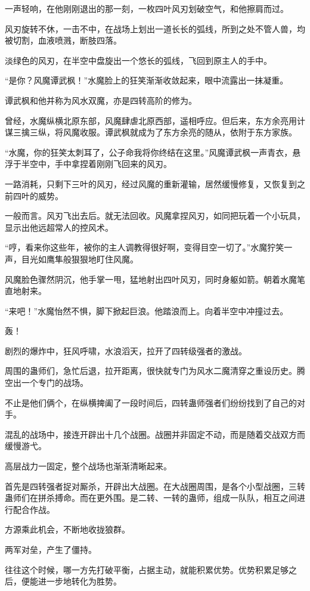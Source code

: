 \begin{this_body}
一声轻响，在他刚刚退出的那一刻，一枚四叶风刃划破空气，和他擦肩而过。

风刃旋转不休，一击不中，在战场上划出一道长长的弧线，所到之处不管人兽，均被切割，血液喷溅，断肢四落。

淡绿色的风刃，在半空中盘旋出一个悠长的弧线，飞回到原主人的手中。

“是你？风魔谭武枫！”水魔脸上的狂笑渐渐收敛起来，眼中流露出一抹凝重。

谭武枫和他并称为风水双魔，亦是四转高阶的修为。

曾经，水魔纵横北原东部，风魔肆虐北原西部，遥相呼应。但后来，东方余亮用计谋三擒三纵，将风魔收服。谭武枫就成为了东方余亮的随从，依附于东方家族。

“水魔，你的狂笑太刺耳了，公子命我将你终结在这里。”风魔谭武枫一声青衣，悬浮于半空中，手中拿捏着刚刚飞回来的风刃。

一路消耗，只剩下三叶的风刃，经过风魔的重新灌输，居然缓慢修复，又恢复到之前四叶的威势。

一般而言。风刃飞出去后。就无法回收。风魔拿捏风刃，如同把玩着一个小玩具，显示出他远超常人的控风术。

“哼，看来你这些年，被你的主人调教得很好啊，变得目空一切了。”水魔狞笑一声，目光如鹰隼般狠狠地盯住风魔。

风魔脸色骤然阴沉，他手掌一甩，猛地射出四叶风刃，同时身躯如箭。朝着水魔笔直地射来。

“来吧！”水魔怡然不惧，脚下掀起巨浪。他踏浪而上。向着半空中冲撞过去。

轰！

剧烈的爆炸中，狂风呼啸，水浪滔天，拉开了四转级强者的激战。

周围的蛊师们，急忙后退，拉开距离，很快就专门为风水二魔清穿之重设历史。腾空出一个专门的战场。

不止是他们俩个，在纵横捭阖了一段时间后，四转蛊师强者们纷纷找到了自己的对手。

混乱的战场中，接连开辟出十几个战圈。战圈并非固定不动，而是随着交战双方而缓慢游弋。

高层战力一固定，整个战场也渐渐清晰起来。

首先是四转强者捉对厮杀，开辟出大战圈。在大战圈周围，是各个小型战圈，三转蛊师们在拼杀搏命。而在更外围。是二转、一转的蛊师，组成一队队，相互之间进行配合作战。

方源乘此机会，不断地收拢狼群。

两军对垒，产生了僵持。

往往这个时候，哪一方先打破平衡，占据主动，就能积累优势。优势积累足够之后，便能进一步地转化为胜势。


\end{this_body}
